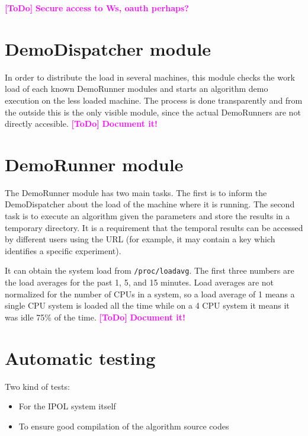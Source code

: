\documentclass[a4paper,12pt]{article}
\newcommand{\ToDo}[1]{\textcolor{magenta}{\textbf{[ToDo]} \textbf{#1}}}
\begin{document}









\ToDo{Secure access to Ws, oauth perhaps?}

\section{DemoDispatcher module}
In order to distribute the load in several machines, this module checks the work load of each known DemoRunner modules and starts an algorithm demo execution on the less loaded machine. The process is done transparently and from the outside this is the only visible module, since the actual DemoRunners are not directly accesible.
\ToDo{Document it!}

\section{DemoRunner module}
The DemoRunner module has two main tasks. The first is to inform the DemoDispatcher about the load of the machine where it is running. The second task is to execute an algorithm given the parameters and store the results in a temporary directory. It is a requirement that the temporal results can be accessed by different users using the URL (for example, it may contain a key which identifies a specific experiment).

It can obtain the system load from {\tt /proc/loadavg}. The first three numbers are the load averages for the past 1, 5, and 15 minutes. Load averages are not normalized for the number of CPUs in a system, so a load  average  of 1 means a single CPU system is loaded all the time while on a 4 CPU system it means it was idle 75\% of the time.
\ToDo{Document it!}






\section{Automatic testing}
Two kind of tests:
\begin{itemize}
  \item For the IPOL system itself
  \item To ensure good compilation of the algorithm source codes
\end{itemize}
\end{document}
